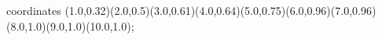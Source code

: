 					coordinates { (1.0,0.32)(2.0,0.5)(3.0,0.61)(4.0,0.64)(5.0,0.75)(6.0,0.96)(7.0,0.96)(8.0,1.0)(9.0,1.0)(10.0,1.0)};